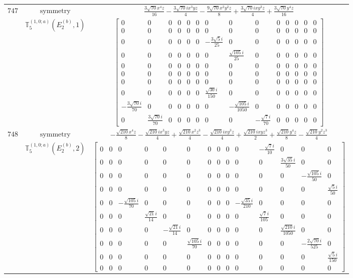\documentclass[fleqn,8pt,landscape]{jsarticle}
\begin{document}
\begin{longtable}{ccc}
$ 747 $ & $ \text{symmetry} $ & $ \frac{3 \sqrt{70} x^{4} z}{16} - \frac{3 \sqrt{70} i x^{3} y z}{4} - \frac{9 \sqrt{70} x^{2} y^{2} z}{8} + \frac{3 \sqrt{70} i x y^{3} z}{4} + \frac{3 \sqrt{70} y^{4} z}{16} $ \\
$  $ & $ \mathbb{T}_{5}^{(1,0;a)}(E_{2}^{(b)},1) $ & $ \begin{bmatrix} 0 & 0 & 0 & 0 & 0 & 0 & 0 & 0 & 0 & 0 & 0 & 0 & 0 & 0 \\ 0 & 0 & 0 & 0 & 0 & 0 & 0 & 0 & 0 & 0 & 0 & 0 & 0 & 0 \\ 0 & 0 & 0 & 0 & 0 & 0 & - \frac{3 \sqrt{5} i}{25} & 0 & 0 & 0 & 0 & 0 & 0 & 0 \\ 0 & 0 & 0 & 0 & 0 & 0 & 0 & \frac{\sqrt{105} i}{25} & 0 & 0 & 0 & 0 & 0 & 0 \\ 0 & 0 & 0 & 0 & 0 & 0 & 0 & 0 & 0 & 0 & 0 & 0 & 0 & 0 \\ 0 & 0 & 0 & 0 & 0 & 0 & 0 & 0 & 0 & 0 & 0 & 0 & 0 & 0 \\ 0 & 0 & 0 & 0 & 0 & 0 & 0 & 0 & 0 & 0 & 0 & 0 & 0 & 0 \\ 0 & 0 & 0 & 0 & 0 & 0 & \frac{\sqrt{30} i}{150} & 0 & 0 & 0 & 0 & 0 & 0 & 0 \\ - \frac{3 \sqrt{70} i}{70} & 0 & 0 & 0 & 0 & 0 & 0 & - \frac{\sqrt{105} i}{1050} & 0 & 0 & 0 & 0 & 0 & 0 \\ 0 & \frac{3 \sqrt{70} i}{70} & 0 & 0 & 0 & 0 & 0 & 0 & - \frac{\sqrt{7} i}{70} & 0 & 0 & 0 & 0 & 0 \end{bmatrix} $ \\ \hline
$ 748 $ & $ \text{symmetry} $ & $ - \frac{\sqrt{210} x^{4} z}{8} - \frac{\sqrt{210} i x^{3} y z}{4} + \frac{\sqrt{210} x^{2} z^{3}}{4} - \frac{\sqrt{210} i x y^{3} z}{4} + \frac{\sqrt{210} i x y z^{3}}{2} + \frac{\sqrt{210} y^{4} z}{8} - \frac{\sqrt{210} y^{2} z^{3}}{4} $ \\
$  $ & $ \mathbb{T}_{5}^{(1,0;a)}(E_{2}^{(b)},2) $ & $ \begin{bmatrix} 0 & 0 & 0 & 0 & 0 & 0 & 0 & 0 & 0 & 0 & - \frac{\sqrt{7} i}{10} & 0 & 0 & 0 \\ 0 & 0 & 0 & 0 & 0 & 0 & 0 & 0 & 0 & 0 & 0 & \frac{3 \sqrt{35} i}{50} & 0 & 0 \\ 0 & 0 & 0 & 0 & 0 & 0 & 0 & 0 & 0 & 0 & 0 & 0 & - \frac{\sqrt{105} i}{50} & 0 \\ 0 & 0 & 0 & 0 & 0 & 0 & 0 & 0 & 0 & 0 & 0 & 0 & 0 & \frac{\sqrt{5} i}{50} \\ 0 & 0 & - \frac{\sqrt{105} i}{70} & 0 & 0 & 0 & 0 & 0 & 0 & - \frac{\sqrt{35} i}{210} & 0 & 0 & 0 & 0 \\ 0 & 0 & 0 & \frac{\sqrt{21} i}{14} & 0 & 0 & 0 & 0 & 0 & 0 & \frac{\sqrt{7} i}{105} & 0 & 0 & 0 \\ 0 & 0 & 0 & 0 & - \frac{\sqrt{21} i}{14} & 0 & 0 & 0 & 0 & 0 & 0 & \frac{\sqrt{210} i}{1050} & 0 & 0 \\ 0 & 0 & 0 & 0 & 0 & \frac{\sqrt{105} i}{70} & 0 & 0 & 0 & 0 & 0 & 0 & - \frac{2 \sqrt{70} i}{525} & 0 \\ 0 & 0 & 0 & 0 & 0 & 0 & 0 & 0 & 0 & 0 & 0 & 0 & 0 & \frac{\sqrt{5} i}{150} \\ 0 & 0 & 0 & 0 & 0 & 0 & 0 & 0 & 0 & 0 & 0 & 0 & 0 & 0 \end{bmatrix} $ \\ \hline

\end{longtable}
\end{document}
